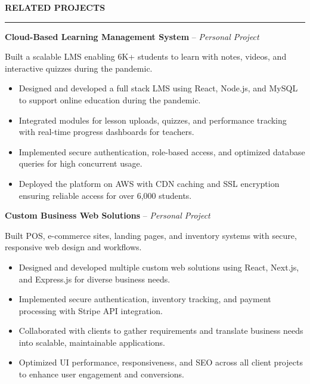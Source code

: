 \documentclass[10pt,letterpaper]{article}
\begin{document}
\textbf{RELATED PROJECTS}\\[-8pt]
\noindent\rule{\textwidth}{1pt}

\vspace{-2pt}

\textbf{Cloud-Based Learning Management System} -- \emph{Personal Project}

\vspace{-1pt}

Built a scalable LMS enabling 6K+ students to learn with notes, videos, and interactive quizzes during the pandemic.
\vspace{-1pt}
\begin{itemize}
\item Designed and developed a full stack LMS using React, Node.js, and MySQL to support online education during the pandemic.
\item Integrated modules for lesson uploads, quizzes, and performance tracking with real-time progress dashboards for teachers.
\item Implemented secure authentication, role-based access, and optimized database queries for high concurrent usage.
\item Deployed the platform on AWS with CDN caching and SSL encryption ensuring reliable access for over 6,000 students.
\end{itemize}

\textbf{Custom Business Web Solutions} -- \emph{Personal Project}

\vspace{-1pt}

Built POS, e-commerce sites, landing pages, and inventory systems with secure, responsive web design and workflows.
\vspace{-1pt}
\begin{itemize}
\item Designed and developed multiple custom web solutions using React, Next.js, and Express.js for diverse business needs.
\item Implemented secure authentication, inventory tracking, and payment processing with Stripe API integration.
\item Collaborated with clients to gather requirements and translate business needs into scalable, maintainable applications.
\item Optimized UI performance, responsiveness, and SEO across all client projects to enhance user engagement and conversions.
\end{itemize}
\end{document}
